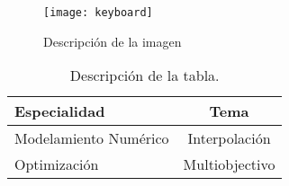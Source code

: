 \begin{exampletwoup}
\begin{figure}[ht!]
\centering
\texttt{[image: keyboard]}
\caption{Descripción de la imagen}
\end{figure}

\begin{table}[ht!]
\caption{Descripción de la tabla.}
\begin{tabular}{|l|c|}
\hline
Especialidad      & Tema      \\
\hline
Modelamiento Numérico & Interpolación \\
\hline
Optimización      & Multiobjectivo  \\
\hline
\end{tabular}
\end{table}
\end{exampletwoup}
